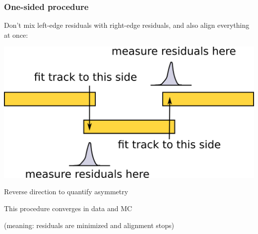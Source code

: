 \documentclass[compress]{beamer}
\begin{document}
\begin{frame}
\frametitle{One-sided procedure}

Don't mix left-edge residuals with right-edge residuals, and also align everything at once:

\vfill
\begin{center}
  \includegraphics[width=0.6\linewidth]{fit_to_both.png}
\end{center}

\vfill
Reverse direction to quantify asymmetry

\vfill
This procedure converges in data and MC

(meaning: residuals are minimized and alignment stops)

\end{frame}
\end{document}
